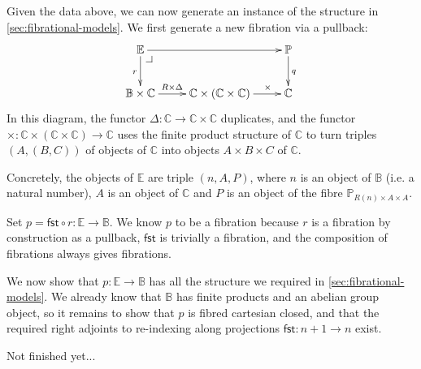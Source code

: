 \documentclass{article}
\makeatletter
\newcommand{\cat}[1]{\mathbb{#1}}
\newcommand{\pullbackcorner}[1][dr]{\save*!/#1-1.2pc/#1:(-1,1)@^{|-}\restore}
\makeatother
\begin{document}
Given the data above, we can now generate an instance of the structure
in \autoref{sec:fibrational-models}. We first generate a new fibration
via a pullback:
\begin{displaymath}
  \xymatrix{
    {\cat{E}} \ar[d]_r \ar[rr] \pullbackcorner
    &
    &
    {\cat{P}} \ar[d]^q
    \\
    {\cat{B} \times \cat{C}} \ar[r]^(.4){R \times \Delta}
    &
    {\cat{C} \times (\cat{C} \times \cat{C})} \ar[r]^(.7)\times
    &
    {\cat{C}}
  }
\end{displaymath}
In this diagram, the functor $\Delta : \cat{C} \to \cat{C} \times
\cat{C}$ duplicates, and the functor $\times : \cat{C} \times (\cat{C}
\times \cat{C}) \to \cat{C}$ uses the finite product structure of
$\cat{C}$ to turn triples $(A,(B,C))$ of objects of $\cat{C}$ into
objects $A \times B \times C$ of $\cat{C}$.

Concretely, the objects of $\cat{E}$ are triple $(n, A, P)$, where $n$
is an object of $\cat{B}$ (i.e. a natural number), $A$ is an object of
$\cat{C}$ and $P$ is an object of the fibre $\cat{P}_{R(n) \times A
  \times A}$.

Set $p = \mathsf{fst} \circ r : \cat{E} \to \cat{B}$. We know $p$ to
be a fibration because $r$ is a fibration by construction as a
pullback, $\mathsf{fst}$ is trivially a fibration, and the composition
of fibrations always gives fibrations.

We now show that $p : \cat{E} \to \cat{B}$ has all the structure we
required in \autoref{sec:fibrational-models}. We already know that
$\cat{B}$ has finite products and an abelian group object, so it
remains to show that $p$ is fibred cartesian closed, and that the
required right adjoints to re-indexing along projections $\mathsf{fst}
: n + 1 \to n$ exist.

{\huge Not finished yet...}
\end{document}
